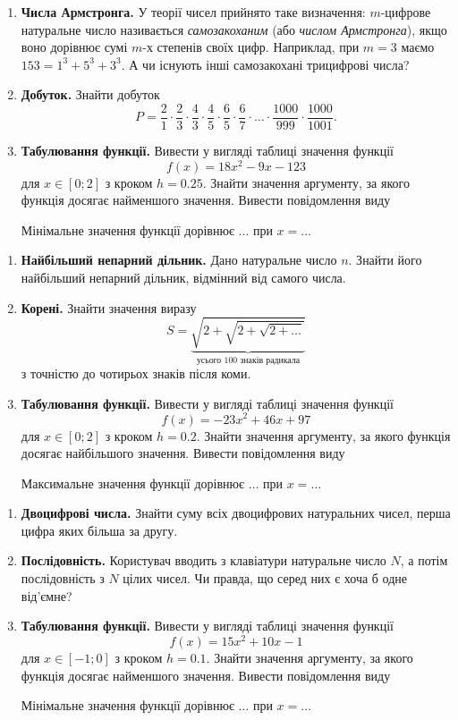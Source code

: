 \begin{enumerate}
\item \textbf{Числа Армстронга.} У теорії чисел прийнято таке визначення: $m$-цифрове натуральне число називається {\itshape самозакоханим} (або {\itshape числом Армстронга}), якщо воно дорівнює сумі $m$-х степенів своїх цифр. Наприклад, при $m=3$ маємо $153=1^3+5^3+3^3$. А чи існують інші самозакохані трицифрові числа?
\item \textbf{Добуток.} Знайти добуток
$$
P=\frac{2}{1}\cdot \frac{2}{3}\cdot \frac{4}{3}\cdot \frac{4}{5}\cdot \frac{6}{5} \cdot \frac{6}{7}\cdot\ldots\cdot\frac{1000}{999}\cdot\frac{1000}{1001}.
$$
\item \textbf{Табулювання функції.} Вивести у вигляді таблиці значення функції
$$
f(x)=18x^2-9x-123
$$
для $ x \in [0; 2] $ з кроком $ h = 0.25 $. Знайти значення аргументу, за якого функція досягає найменшого значення. Вивести повідомлення виду

{\ttfamily\color{blue} Мінімальне значення функції дорівнює $\ldots$ при $x = \ldots$}
\end{enumerate}

 


\begin{enumerate}
\item \textbf{Найбільший непарний дільник.} Дано натуральне число $n$. Знайти його найбільший непарний дільник, відмінний від самого числа.
\item \textbf{Корені.} Знайти значення виразу
$$
S=\underbrace{\sqrt{2+\sqrt{2+\sqrt{2+\ldots}}}}_{\text{усього 100 знаків радикала}}
$$
з точністю до чотирьох знаків після коми.
\item \textbf{Табулювання функції.} Вивести у вигляді таблиці значення функції
$$
f(x)=-23x^2+46x+97
$$
для $x \in [0; 2]$ з кроком $ h = 0.2 $. Знайти значення аргументу, за якого функція досягає найбільшого значення. Вивести повідомлення виду

 {\ttfamily\color{blue} Максимальне значення функції дорівнює $\ldots$  при  $x = \ldots $ }
\end{enumerate}


 


\begin{enumerate}
\item \textbf{Двоцифрові числа.} Знайти суму всіх двоцифрових натуральних чисел, перша цифра яких більша за другу.
\item \textbf{Послідовність.} Користувач вводить з клавіатури натуральне число $N$, а потім по\-слі\-до\-вність з $N$ цілих чисел. Чи правда, що серед них є хоча б одне від'ємне?
\item \textbf{Табулювання функції.} Вивести у вигляді таблиці значення функції
$$
f(x)=15x^2+10x-1
$$
для $ x \in [-1; 0]$ з кроком $h=0.1$. Знайти значення аргументу, за якого функція досягає найменшого значення. Вивести повідомлення виду

 {\ttfamily\color{blue} Мінімальне значення функції дорівнює $\ldots$  при  $x = \ldots $ }
\end{enumerate}

